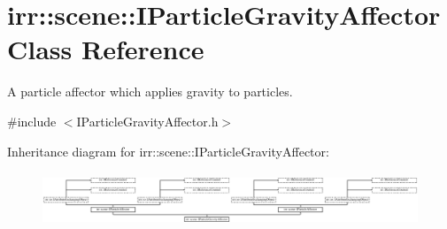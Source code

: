 \hypertarget{classirr_1_1scene_1_1IParticleGravityAffector}{}\section{irr\+:\+:scene\+:\+:I\+Particle\+Gravity\+Affector Class Reference}
\label{classirr_1_1scene_1_1IParticleGravityAffector}


A particle affector which applies gravity to particles.  




{\ttfamily \#include $<$I\+Particle\+Gravity\+Affector.\+h$>$}

Inheritance diagram for irr\+:\+:scene\+:\+:I\+Particle\+Gravity\+Affector\+:\begin{figure}[H]
\begin{center}
\leavevmode
\includegraphics[height=1.650943cm]{classirr_1_1scene_1_1IParticleGravityAffector}
\end{center}
\end{figure}

